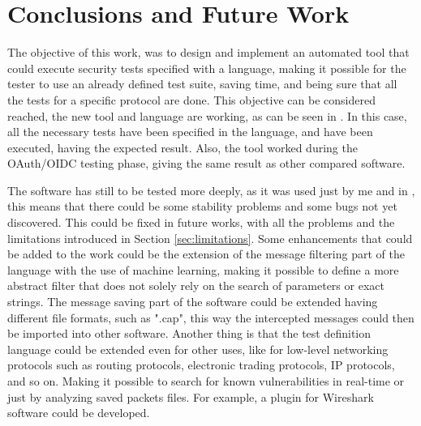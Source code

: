 \chapter{Conclusions and Future Work}
\label{chap:Conclusions}
The objective of this work, was to design and implement an automated tool that could execute security tests specified with a language, making it possible for the tester to use an already defined test suite, saving time, and being sure that all the tests for a specific protocol are done. This objective can be considered reached, the new tool and language are working, as can be seen in \cite{sofia_zanrosso}. In this case, all the necessary tests have been specified in the language, and have been executed, having the expected result. Also, the tool worked during the OAuth/OIDC testing phase, giving the same result as other compared software. 

The software has still to be tested more deeply, as it was used just by me and in \cite{sofia_zanrosso}, this means that there could be some stability problems and some bugs not yet discovered. This could be fixed in future works, with all the problems and the limitations introduced in Section \ref{sec:limitations}. Some enhancements that could be added to the work could be the extension of the message filtering part of the language with the use of machine learning, making it possible to define a more abstract filter that does not solely rely on the search of parameters or exact strings. The message saving part of the software could be extended having different file formats, such as ".cap", this way the intercepted messages could then be imported into other software.
Another thing is that the test definition language could be extended even for other uses, like for low-level networking protocols such as routing protocols, electronic trading protocols, IP protocols, and so on. Making it possible to search for known vulnerabilities in real-time or just by analyzing saved packets files. For example, a plugin for Wireshark software could be developed. 



